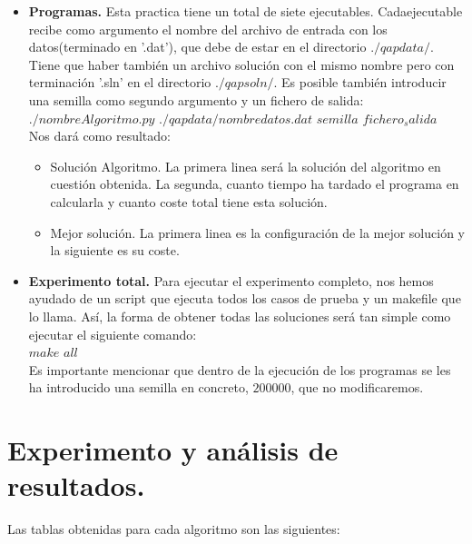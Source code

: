 \begin{itemize}
	\item \textbf{Programas.} Esta practica tiene un total de siete ejecutables. Cadaejecutable recibe como argumento el nombre del archivo de entrada con los datos(terminado en '.dat'), que debe de estar en el directorio $./qapdata/$. Tiene que haber también un archivo solución con el mismo nombre pero con terminación '.sln'  en el directorio $./qapsoln/$. Es posible también introducir una semilla como segundo argumento y un fichero de salida:\\
	
	$./nombreAlgoritmo.py$ $./qapdata/nombredatos.dat$ $semilla$ $fichero_salida$\\
	
	Nos dará como resultado:\\
	\begin{itemize}
		\item Solución Algoritmo. La primera linea será la solución del algoritmo en cuestión obtenida. La segunda, cuanto tiempo ha tardado el programa en calcularla y cuanto coste total tiene esta solución.
		\item Mejor solución. La primera linea es la configuración de la mejor solución y la siguiente es su coste.
	\end{itemize}
	
	\item \textbf{Experimento total.} Para ejecutar el experimento completo, nos hemos ayudado de un script que ejecuta todos los casos de prueba y un makefile que lo llama. Así, la forma de obtener todas las soluciones será tan simple como ejecutar el siguiente comando:\\
	
	$make$ $all$\\
	
	Es importante mencionar que dentro de la ejecución de los programas se les ha introducido una semilla en concreto, $200000$, que no modificaremos.\\
	
	
\end{itemize}

\newpage
\section{Experimento y análisis de resultados.}

Las tablas obtenidas para cada algoritmo son las siguientes:\\


